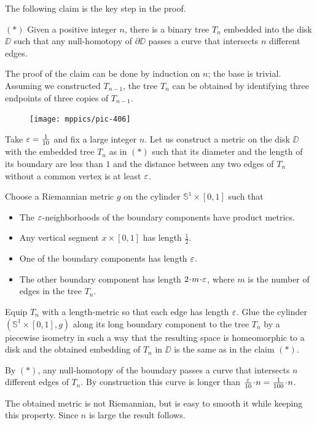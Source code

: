 The following claim is the key step in the proof.
\begin{cl}{$({*})$}
Given a positive integer $n$, there is a binary tree $T_n$ embedded into the disk $\DD$ such that any null-homotopy of $\partial \DD$ passes a curve that intersects $n$ different edges.
\end{cl}


The proof of the claim can be done by induction on $n$; the base is trivial.
Assuming we constructed $T_{n-1}$, the tree $T_n$ can be obtained by identifying three endpoints of three copies of $T_{n-1}$.

\begin{figure}[h!]
\vskip0mm
\centering
\texttt{[image: mppics/pic-406]}
\end{figure}

Take $\varepsilon=\tfrac1{10}$ and fix a large integer $n$.
Let us construct a metric on the disk $\DD$ with the embedded tree $T_n$ as in $({*})$ such that
its diameter and the length of its boundary are less than $1$
and  
the distance between any two edges of $T_n$ without a common vertex 
is at least $\varepsilon$.

Choose a Riemannian metric $g$ on the cylinder $\mathbb S^1\times [0,1]$ such that
\begin{itemize}
\item The $\varepsilon$-neighborhoods of the boundary components 
have product metrics.
\item Any vertical segment $x\times[0,1]$ has length $\tfrac 12$.
\item One of the boundary components has length $\varepsilon$.
\item The other boundary component has length $2\cdot m\cdot \eps$, 
where $m$ is the number of edges in the tree $T_n$.
\end{itemize}
Equip $T_n$ with a length-metric so that each edge has length $\varepsilon$.
Glue the cylinder $(\mathbb S^1\times [0,1],g)$ along its long boundary component to the tree $T_n$ by a piecewise isometry 
in such a way that the resulting space is homeomorphic to a disk and the obtained embedding of $T_n$ in $\DD$ is the same as in the claim $({*})$.

By $({*})$, any null-homotopy of the boundary passes a curve that intersects $n$ different edges of $T_n$.
By construction this curve is longer than $\tfrac{\eps}{10}\cdot n=\tfrac{1}{100}\cdot n$.

The obtained metric is not Riemannian, but is easy to smooth it while keeping this property.
Since $n$ is large the result follows.
\qeds
 

